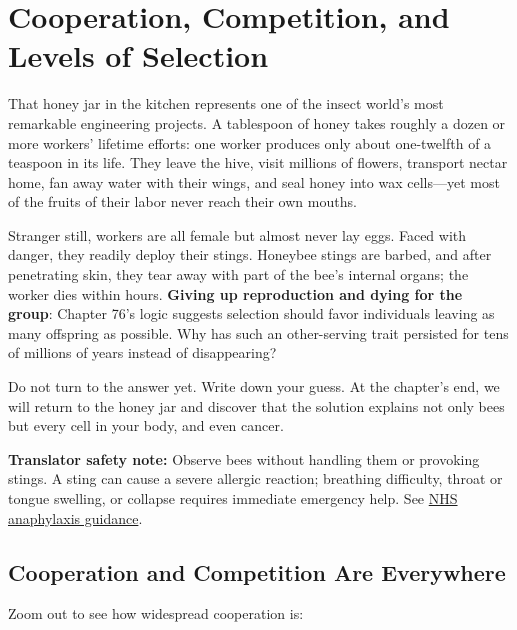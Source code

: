 \chapter{Cooperation, Competition, and Levels of Selection}

\begin{kaichang}
That honey jar in the kitchen represents one of the insect world's most remarkable engineering projects. A tablespoon of honey takes roughly a dozen or more workers' lifetime efforts: one worker produces only about one-twelfth of a teaspoon in its life. They leave the hive, visit millions of flowers, transport nectar home, fan away water with their wings, and seal honey into wax cells---yet most of the fruits of their labor never reach their own mouths.

Stranger still, workers are all female but almost never lay eggs. Faced with danger, they readily deploy their stings. Honeybee stings are barbed, and after penetrating skin, they tear away with part of the bee's internal organs; the worker dies within hours. \textbf{Giving up reproduction and dying for the group}: Chapter 76's logic suggests selection should favor individuals leaving as many offspring as possible. Why has such an other-serving trait persisted for tens of millions of years instead of disappearing?

Do not turn to the answer yet. Write down your guess. At the chapter's end, we will return to the honey jar and discover that the solution explains not only bees but every cell in your body, and even cancer.
\end{kaichang}

\textbf{Translator safety note:} Observe bees without handling them or provoking stings. A sting can cause a severe allergic reaction; breathing difficulty, throat or tongue swelling, or collapse requires immediate emergency help. See \href{https://www.nhs.uk/conditions/anaphylaxis/}{NHS anaphylaxis guidance}.

\section{Cooperation and Competition Are Everywhere}

Zoom out to see how widespread cooperation is:

